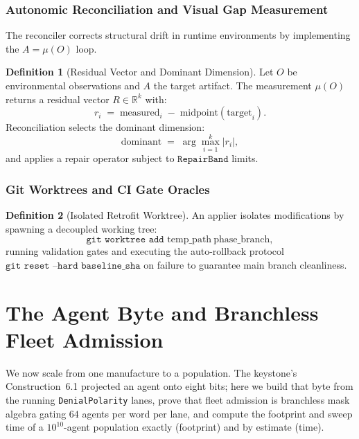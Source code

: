 \documentclass[11pt,oneside]{book}
\theoremstyle{definition}
\newtheorem{definition}{Definition}[chapter]
\theoremstyle{plain}
\theoremstyle{remark}
\newcommand{\muop}{\mu}                        %
\newcommand{\code}[1]{\texttt{#1}}
\begin{document}
\subsection{Autonomic Reconciliation and Visual Gap Measurement}

The reconciler corrects structural drift in runtime environments by implementing the $A = \muop(O)$ loop.

\begin{definition}[Residual Vector and Dominant Dimension]\label{def:residual}
Let $O$ be environmental observations and $A$ the target artifact. The measurement $\muop(O)$ returns a residual vector $R \in \mathbb{R}^k$ with:
\begin{equation}\label{eq:residual}
r_i \;=\; \text{measured}_i \;-\; \text{midpoint}(\text{target}_i).
\end{equation}
Reconciliation selects the dominant dimension:
\[
\text{dominant} \;=\; \arg\max_{i=1}^k |r_i|,
\]
and applies a repair operator subject to $\code{RepairBand}$ limits.
\end{definition}

\subsection{Git Worktrees and CI Gate Oracles}

\begin{definition}[Isolated Retrofit Worktree]\label{def:worktree}
An applier isolates modifications by spawning a decoupled working tree:
\begin{equation}\label{eq:worktree}
\code{git worktree add } \text{temp\_path} \ \text{phase\_branch},
\end{equation}
running validation gates and executing the auto-rollback protocol $\code{git reset --hard baseline\_sha}$ on failure to guarantee main branch cleanliness.
\end{definition}

\chapter{The Agent Byte and Branchless Fleet Admission}
\label{ch:agent8}

We now scale from one manufacture to a population. The keystone's Construction~6.1 projected an
agent onto eight bits; here we build that byte from the running \code{DenialPolarity} lanes, prove
that fleet admission is branchless mask algebra gating $64$ agents per word per lane, and compute
the footprint and sweep time of a $10^{10}$-agent population exactly (footprint) and by estimate
(time).
\end{document}
